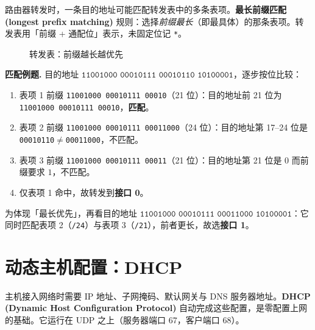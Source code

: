 路由器转发时，一条目的地址可能匹配转发表中的多条表项。\textbf{最长前缀匹配 (longest prefix matching)} 规则：选择\emph{前缀最长}（即最具体）的那条表项。转发表用「前缀 + 通配位」表示，未固定位记 \texttt{*}。

\begin{figure}[H]
\centering
{}
\caption{转发表：前缀越长越优先}
\label{fig:lpm_table}
\end{figure}

\noindent\textbf{匹配例题.} 目的地址 $\texttt{11001000 00010111 00010110 10100001}$，逐步按位比较：

\begin{enumerate}
    \item 表项 1 前缀 \texttt{11001000 00010111 00010}（21 位）：目的地址前 21 位为 \texttt{11001000 00010111 00010}，\textbf{匹配}。
    \item 表项 2 前缀 \texttt{11001000 00010111 00011000}（24 位）：目的地址第 17--24 位是 \texttt{00010110}$\neq$\texttt{00011000}，不匹配。
    \item 表项 3 前缀 \texttt{11001000 00010111 00011}（21 位）：目的地址第 21 位是 $0$ 而前缀要求 $1$，不匹配。
    \item 仅表项 1 命中，故转发到\textbf{接口 0}。
\end{enumerate}

\noindent 为体现「最长优先」，再看目的地址 $\texttt{11001000 00010111 00011000 10100001}$：它同时匹配表项 2（\texttt{/24}）与表项 3（\texttt{/21}），前者更长，故选\textbf{接口 1}。

\section{动态主机配置：DHCP}

主机接入网络时需要 IP 地址、子网掩码、默认网关与 DNS 服务器地址。\textbf{DHCP (Dynamic Host Configuration Protocol)} 自动完成这些配置，是零配置上网的基础。它运行在 UDP 之上（服务器端口 67，客户端口 68）。

